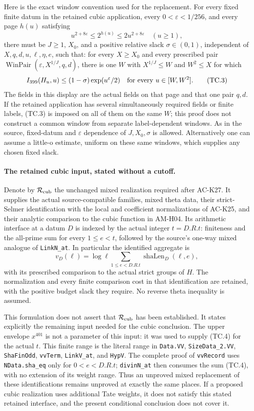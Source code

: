 Here is the exact window convention used for the replacement.
For every fixed finite datum in the retained cubic application,
every $0<\varepsilon<1/256$, and every page $h(u)$ satisfying
\[
 u^{2+8\varepsilon}\leq 2^{h(u)}
                   \leq2u^{2+8\varepsilon}\quad(u\geq1),
 \tag{TC.2}
\]
there must be $J\geq1$, $X_0$, and a positive relative slack
$\sigma\in(0,1)$, independent of $X,q,d,u,\ell,\eta,e$, such that:
for every $X\geq X_0$ and every prescribed pair
$\operatorname{WinPair}(\varepsilon,X^{1/J},q,d)$, there is one
$W$ with $X^{1/J}\leq W$ and $W^2\leq X$ for which
\[
 I_{399}(H_u,u)\leq(1-\sigma)\exp(u^\varepsilon/2)
                 \quad\hbox{for every }u\in[W,W^2].
 \tag{TC.3}
\]
The fields in this display are the actual fields on that page and
that one pair $q,d$.  If the retained application has several
simultaneously required fields or finite labels, (TC.3) is imposed
on all of them on the same $W$; this proof does not construct a
common window from separate label-dependent windows.  As in the
source, fixed-datum and $\varepsilon$ dependence of $J,X_0,\sigma$
is allowed.  Alternatively one can assume a little-o estimate,
uniform on these same windows, which supplies any chosen fixed slack.

\paragraph{The retained cubic input, stated without a cutoff.}
Denote by $\mathcal R_{\rm cub}$ the unchanged mixed realization
required after AC-K27.  It supplies the actual source-compatible
families, mixed theta data, their strict-Selmer identification with
the local and coefficient normalizations of AC-K25, and their
analytic comparison to the cubic function in AM-H04.  Its arithmetic
interface at a datum $D$ is indexed by the actual integer $t=D.R.t$:
finiteness and the all-prime sum for every $1\leq e<t$, followed by
the source's one-way mixed analogue of \texttt{LinkN\_at}.
In particular the identified aggregate is
\[
 v_D(\ell)=\log\ell\sum_{1\leq e<D.R.t}
                         \operatorname{shaLen}_D(\ell,e),
 \tag{TC.4}
\]
with its prescribed comparison to the actual strict groups of $H$.
The normalization and every finite comparison cost in that
identification are retained, with the positive budget slack they
require.  No reverse theta inequality is assumed.

This formulation does not assert that $\mathcal R_{\rm cub}$ has
been established.  It states explicitly the remaining input needed
for the cubic conclusion.  The upper envelope $x^{401}$ is not a
parameter of this input: it was used to supply (TC.4) for the actual
$t$.  This finite range is the literal range in \texttt{Data.VV},
\texttt{SizeData\_2.VV}, \texttt{ShaFinOdd}, \texttt{vvTerm},
\texttt{LinkV\_at}, and \texttt{HypV}.  The complete proof of
\texttt{vvRecord} uses \texttt{NData.sha\_eq} only for $0<e<D.R.t$;
\texttt{divinN\_at} then consumes the sum (TC.4), with no extension
of its weight range.  Thus an unproved mixed replacement of these
identifications remains unproved at exactly the same places.
If a proposed cubic realization uses additional Tate weights,
it does not satisfy this stated retained interface, and the present
conditional conclusion does not cover it.

